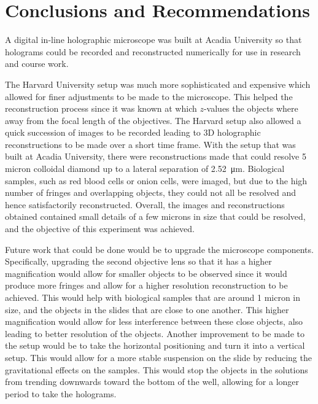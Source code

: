 %
%
\chapter{Conclusions and Recommendations} \label{chap:Conclusion}

A digital in-line holographic microscope was built at Acadia University
so that holograms could be recorded and reconstructed numerically 
for use in research and course work.

The Harvard University setup was much more sophisticated and expensive which
allowed for finer adjustments to be made to the microscope. This helped the
reconstruction process since it was known at which $z$-values the objects where
away from the focal length of the objectives. The Harvard setup also allowed
a quick succession of images to be recorded leading to 3D holographic
reconstructions to
be made over a short time frame.
With the
setup that was built at Acadia University, there were
reconstructions made that could resolve 5 micron colloidal diamond up to a
lateral separation of \SI{2.52}{\micro\meter}. Biological
samples, such as red blood cells or onion cells, were imaged, but due to the
high number of
fringes and overlapping objects, they could not all be resolved 
and hence satisfactorily reconstructed.
Overall, the images and reconstructions obtained
contained small details of a few microns in size that could be resolved,
and the objective of this experiment was achieved.

Future work that could be done would be to upgrade the microscope components.
Specifically, upgrading the second objective lens so that it has a higher magnification
would allow for smaller objects to be observed since it would produce more fringes and
allow for a higher resolution reconstruction to be achieved. This would help
with biological samples that are around 1 micron
in size, and the objects in the slides that are close to one another. This higher
magnification would allow for less interference between these close objects,
also leading to better resolution of the objects. Another improvement to be
made to the setup would be to take the horizontal positioning and turn it into a
vertical setup. This would allow for a more stable suspension on the slide
by reducing the gravitational effects on the samples. This would stop the
objects in the solutions from trending downwards toward the bottom of the well, allowing
for a longer period to take the holograms.

